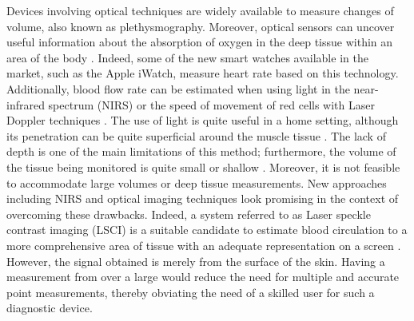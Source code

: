 Devices involving optical techniques are widely available to measure changes of volume, also known as plethysmography. Moreover, optical sensors can uncover useful information about the absorption of oxygen in the deep tissue within an area of the body \cite{holohan1996plethysmography}. Indeed, some of the new smart watches available in the market, such as the Apple iWatch, measure heart rate based on this technology\cite{culbert2017user}. Additionally, blood flow rate can be estimated when using light in the near-infrared spectrum (NIRS) \cite{van2001performance, harel2008near, de1993noninvasive, gurley2012noninvasive} or the speed of movement of red cells with Laser Doppler techniques \cite{fredriksson2007laser, dirnagl1989continuous}. The use of light is quite useful in a home setting, although its penetration can be quite superficial around the muscle tissue \cite{bashkatov2005optical}. The lack of depth is one of the main limitations of this method; furthermore, the volume of the tissue being monitored is quite small or shallow \cite{bashkatov2005optical}. Moreover, it is not feasible to accommodate large volumes or deep tissue measurements. New approaches including NIRS and optical imaging techniques look promising in the context of overcoming these drawbacks. Indeed, a system referred to as Laser speckle contrast imaging (LSCI) is a suitable candidate to estimate blood circulation to a more comprehensive area of tissue with an adequate representation on a screen \cite{briers2013laser}. However, the signal obtained is merely from the surface of the skin. Having a measurement from over a large would reduce the need for multiple and accurate point measurements, thereby obviating the need of a skilled user for such a diagnostic device. 

